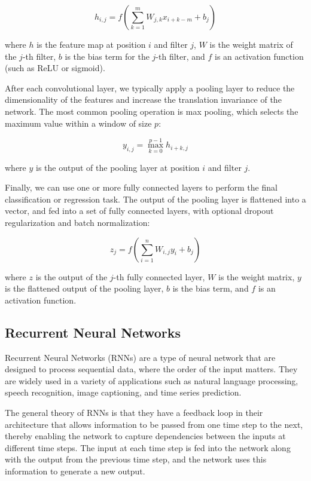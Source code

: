 \begin{equation}
h_{i,j} = f(\sum_{k=1}^m W_{j,k} x_{i+k-m} + b_j)
\end{equation}

where $h$ is the feature map at position $i$ and filter $j$, $W$ is the weight matrix of the $j$-th filter, $b$ is the bias term for the $j$-th filter, and $f$ is an activation function (such as ReLU or sigmoid).

After each convolutional layer, we typically apply a pooling layer to reduce the dimensionality of the features and increase the translation invariance of the network. The most common pooling operation is max pooling, which selects the maximum value within a window of size $p$:

\begin{equation}
y_{i,j} = \max_{k=0}^{p-1} h_{i+k,j}
\end{equation}

where $y$ is the output of the pooling layer at position $i$ and filter $j$.

Finally, we can use one or more fully connected layers to perform the final classification or regression task. The output of the pooling layer is flattened into a vector, and fed into a set of fully connected layers, with optional dropout regularization and batch normalization:

\begin{equation}
z_j = f(\sum_{i=1}^n W_{i,j} y_i + b_j)
\end{equation}

where $z$ is the output of the $j$-th fully connected layer, $W$ is the weight matrix, $y$ is the flattened output of the pooling layer, $b$ is the bias term, and $f$ is an activation function. 

\subsection{Recurrent Neural Networks}
\label{subsec:3_rnns}

Recurrent Neural Networks (RNNs) are a type of neural network that are designed to process sequential data, where the order of the input matters. They are widely used in a variety of applications such as natural language processing, speech recognition, image captioning, and time series prediction.

The general theory of RNNs is that they have a feedback loop in their architecture that allows information to be passed from one time step to the next, thereby enabling the network to capture dependencies between the inputs at different time steps. The input at each time step is fed into the network along with the output from the previous time step, and the network uses this information to generate a new output.

